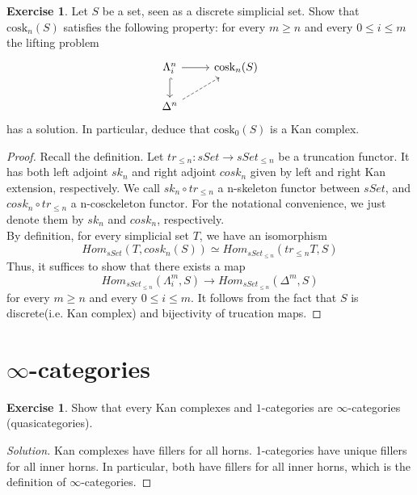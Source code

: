 \documentclass[10pt,a4paper,reqno,oneside]{book} %
\theoremstyle{plain}
\theoremstyle{definition}
\newtheorem{exercise}[thm]{Exercise}
\theoremstyle{remark}
\numberwithin{equation}{section}
\begin{document}
\begin{exercise} \label{ex:coskeleton_Kan_complex}
	Let $S$ be a set, seen as a discrete simplicial set.
	Show that $\mathrm{cosk}_n(S)$ satisfies the following property: for every $m \ge n$ and every $0 \le i \le m$ the lifting problem
	\[ \begin{tikzcd}
		\Lambda^n_i \arrow{r} \arrow[hook]{d} & \mathrm{cosk}_n(S) \\
		\Delta^n \arrow[dashed]{ur}
	\end{tikzcd} \]
	has a solution.
	In particular, deduce that $\mathrm{cosk}_0(S)$ is a Kan complex.
\end{exercise}

\begin{proof}
    Recall the definition. Let $tr_{\leq n}:sSet \to sSet_{\leq n}$ be a truncation functor. It has both left adjoint $sk_n$ and right adjoint $cosk_n$ given by left and right Kan extension, respectively. We call $sk_n \circ tr_{\leq n}$ a n-skeleton functor between $sSet$, and $cosk_n \circ tr_{\leq n}$ a n-cosckeleton functor. For the notational convenience, we just denote them by $sk_n$ and $cosk_n$, respectively. \\
    By definition, for every simplicial set $T$, we have an isomorphism 
    \[Hom_{sSet}(T, cosk_n(S)) \simeq Hom_{sSet_{\leq n}}(tr_{\leq n}T, S)\]
    Thus, it suffices to show that there exists a map 
    \[Hom_{sSet_{\leq n}}(\Lambda^m_i, S) \to Hom_{sSet_{\leq n}}(\Delta^m, S)\]
    for every $m \geq n$ and every $0 \leq i \leq m$. It follows from the fact that $S$ is discrete(i.e. Kan complex) and bijectivity of trucation maps. 
\end{proof}

\section{$\infty$-categories}

\begin{exercise}
	Show that every Kan complexes and $1$-categories are $\infty$-categories (quasicategories).
\end{exercise}

\ifpersonal
\begin{proof}[Solution]
Kan complexes have fillers for all horns. 1-categories have unique fillers for all inner horns. In particular, both have
fillers for all inner horns, which is the definition of $\infty$-categories.
\end{proof}
\fi
\end{document}
